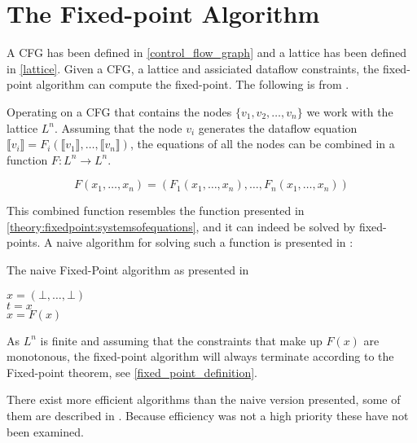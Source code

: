 \section{The Fixed-point Algorithm}\label{fixed_point_algorithm}
A CFG has been defined in \cref{control_flow_graph} and a lattice has been defined in \cref{lattice}.
Given a CFG, a lattice and assiciated dataflow constraints, the fixed-point algorithm can compute the fixed-point.
The following is from \citet{schwartzbach}.

Operating on a CFG that contains the nodes $\{ v_1, v_2, \dots, v_n \}$ we work with the lattice $L^n$.
Assuming that the node $v_i$ generates the dataflow equation $\llbracket v_i \rrbracket = F_i ( \llbracket v_1 \rrbracket, \dots, \llbracket v_n \rrbracket)$, the equations of all the nodes can be combined in a function $ F: L^n \rightarrow L^n$.

\[ F(x_1, \dots, x_n) = (F_1(x_1, \dots, x_n), \dots, F_n(x_1, \dots, x_n)) \]

This combined function resembles the function presented in \cref{theory:fixedpoint:systemsofequations}, and it can indeed be solved by fixed-points.
A naive algorithm for solving such a function is presented in \citet{schwartzbach}:

\begin{algorithm}
  \caption{The naive Fixed-Point algorithm as presented in \citet[p.18~]{schwartzbach}}\label{fixed-point_algo}  
  \DontPrintSemicolon
  $x = (\bot, \dots, \bot)$ \\
         {
           $t = x$\\
           $x = F(x)$
         }
\end{algorithm}

As $L^n$ is finite and assuming that the constraints that make up $F(x)$ are monotonous, the fixed-point algorithm will always terminate according to the Fixed-point theorem, see \cref{fixed_point_definition}.

There exist more efficient algorithms than the naive version presented, some of them are described in \citet[p.~18]{schwartzbach}.
Because efficiency was not a high priority these have not been examined.
